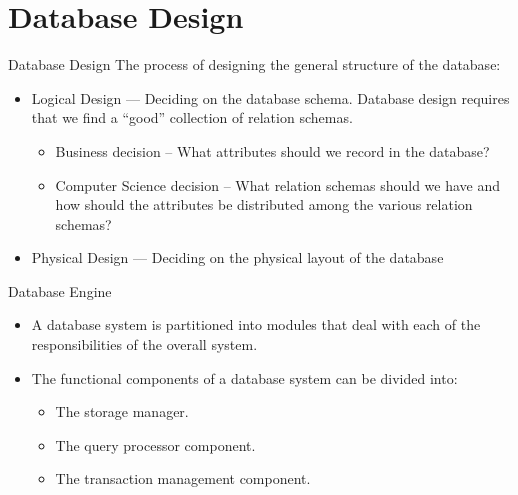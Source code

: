 \documentclass[aspectratio=169]{beamer}
\begin{document}
\section{Database Design}

\begin{frame}{Database Design}
The process of designing the general structure of the database:
    \begin{itemize}
        \item Logical Design --- Deciding on the database schema. Database design requires that we find a “good” collection of relation schemas.
        \begin{itemize}
            \item Business decision -- What attributes should we record in the database?
            \item Computer Science decision --  What relation schemas should we have and how should the attributes be distributed among the various relation schemas?
        \end{itemize}
        \item Physical Design --- Deciding on the physical layout of the database                
    \end{itemize}
\end{frame}

\begin{frame}{Database Engine}
    \begin{itemize}
        \item A database system is partitioned into modules that deal with each of the responsibilities of the overall system.  
        \item The functional components of a database system can be divided into:
        \begin{itemize}
            \item The storage manager.
            \item The  query processor component.
            \item The transaction management component.
        \end{itemize}
    \end{itemize}
\end{frame}
\end{document}
